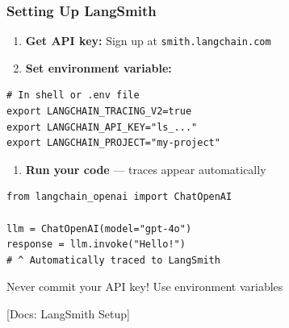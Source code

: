 \documentclass[aspectratio=169,11pt]{beamer}
\newcommand{\docref}[1]{{\scriptsize\color{docgray}[Docs: #1]}}
\begin{document}
\begin{frame}[fragile]
  \frametitle{Setting Up LangSmith}

  \begin{enumerate}
    \setlength{\itemsep}{1pt}
    \item \textbf{Get API key:} Sign up at \texttt{smith.langchain.com}
    \item \textbf{Set environment variable:}
  \end{enumerate}

  \begin{lstlisting}
# In shell or .env file
export LANGCHAIN_TRACING_V2=true
export LANGCHAIN_API_KEY="ls_..."
export LANGCHAIN_PROJECT="my-project"
  \end{lstlisting}

  \vspace{0.1cm}

  \begin{enumerate}
    \setlength{\itemsep}{1pt}
    \setcounter{enumi}{2}
    \item \textbf{Run your code} — traces appear automatically
  \end{enumerate}

  \begin{lstlisting}
from langchain_openai import ChatOpenAI

llm = ChatOpenAI(model="gpt-4o")
response = llm.invoke("Hello!")
# ^ Automatically traced to LangSmith
  \end{lstlisting}

  \vspace{0.1cm}

  \begin{warningbox}[Important]
    Never commit your API key! Use environment variables
  \end{warningbox}

  \docref{LangSmith Setup}
\end{frame}

\end{document}
